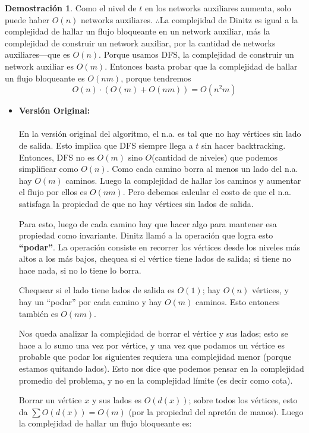 \documentclass[11pt, a4paper]{article}
\theoremstyle{definition}
\newtheorem*{demostracion}{Demostración}
\begin{document}
\begin{demostracion}
    Como el nivel de $t$ en los networks auxiliares aumenta, solo puede haber $O(n)$ networks auxiliares. 
    \(\therefore\)La complejidad de Dinitz es igual a la complejidad de hallar un flujo bloqueante en un network auxiliar, 
    más la complejidad de construir un network auxiliar, 
    por la cantidad de networks auxiliares---que es $O(n)$. 
    Porque usamos DFS, la complejidad de construir un network auxiliar es $O(m)$. 
    Entonces basta probar que la complejidad de hallar un flujo bloqueante es $O(nm)$, porque tendremos
    \[ O(n) \cdot (O(m) + O(nm)) = O(n^2m) \]

    \newpage

    \begin{itemize}
        \item \textbf{Versión Original: } \\ \\
        En la versión original del algoritmo, el n.a. es tal que no hay vértices sin lado de salida. Esto implica que DFS siempre llega a $t$ sin hacer backtracking. Entonces, DFS no es $O(m)$ sino $O$(cantidad de niveles) que podemos simplificar como $O(n)$. Como cada camino borra al menos un lado del n.a. hay $O(m)$ caminos. Luego la complejidad de hallar los caminos y aumentar el flujo por ellos es $O(nm)$. Pero debemos calcular el costo de que el n.a. satisfaga la propiedad de que no hay vértices sin lados de salida.

        Para esto, luego de cada camino hay que hacer algo para mantener esa propiedad como invariante. Dinitz llamó a la operación que logra esto \textbf{``podar''}. La operación consiste en recorrer los vértices desde los niveles más altos a los más bajos, chequea si el vértice tiene lados de salida; si tiene no hace nada, si no lo tiene lo borra.
        
        Chequear si el lado tiene lados de salida es $O(1)$; hay $O(n)$ vértices, y hay un ``podar'' por cada camino y hay $O(m)$ caminos. Esto entonces también es $O(nm)$.
        
        Nos queda analizar la complejidad de borrar el vértice y sus lados; esto se hace a lo sumo una vez por vértice, y una vez que podamos un vértice es probable que podar los siguientes requiera una complejidad menor (porque estamos quitando lados). Esto nos dice que podemos pensar en la complejidad promedio del problema, y no en la complejidad límite (es decir como cota).
        
        Borrar un vértice $x$ y sus lados es $O(d(x))$; sobre todos los vértices, esto da $\sum O(d(x)) = O(m)$ (por la propiedad del apretón de manos). Luego la complejidad de hallar un flujo bloqueante es:
        

\end{itemize}
\end{demostracion}
\end{document}
